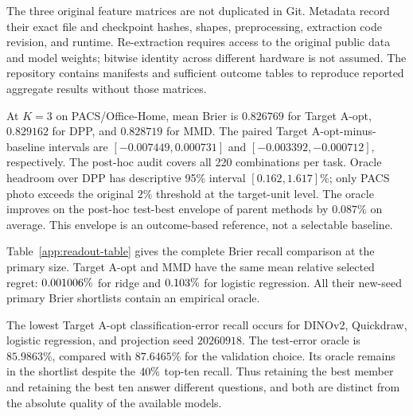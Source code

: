 \documentclass{article}
\begin{document}
The three original feature matrices are not duplicated in Git. Metadata record their exact file and checkpoint hashes, shapes, preprocessing, extraction code revision, and runtime. Re-extraction requires access to the original public data and model weights; bitwise identity across different hardware is not assumed. The repository contains manifests and sufficient outcome tables to reproduce reported aggregate results without those matrices.

At $K=3$ on PACS/Office-Home, mean Brier is $0.826769$ for Target A-opt, $0.829162$ for DPP, and $0.828719$ for MMD. The paired Target A-opt-minus-baseline intervals are $[-0.007449,0.000731]$ and $[-0.003392,-0.000712]$, respectively. The post-hoc audit covers all 220 combinations per task. Oracle headroom over DPP has descriptive 95\% interval $[0.162,1.617]\%$; only PACS photo exceeds the original $2\%$ threshold at the target-unit level. The oracle improves on the post-hoc test-best envelope of parent methods by $0.087\%$ on average. This envelope is an outcome-based reference, not a selectable baseline.

Table~\ref{app:readout-table} gives the complete Brier recall comparison at the primary size. Target A-opt and MMD have the same mean relative selected regret: $0.001006\%$ for ridge and $0.103\%$ for logistic regression. All their new-seed primary Brier shortlists contain an empirical oracle.

\begin{table}[t]
\centering
\caption{The exploratory DomainNet follow-up evaluates shortlists of size $s=227$. Test top-ten recall (\%) is averaged over two encoders and four new projection seeds within each target domain, then over six domains. Ridge denotes ridge-softmax. NLL and error use matching validation losses for final selection.}
\label{tab:readout}

\end{table}

\begin{table}[ht]
\centering
\caption{Brier top-ten recall (\%) is reported for all follow-up scoring rules at $s=227$. Averages use the same domain-level procedure as Table~\ref{tab:readout}; original-seed controls are excluded.}
\label{app:readout-table}

\end{table}

The lowest Target A-opt classification-error recall occurs for DINOv2, Quickdraw, logistic regression, and projection seed $20260918$. The test-error oracle is $85.9863\%$, compared with $87.6465\%$ for the validation choice. Its oracle remains in the shortlist despite the $40\%$ top-ten recall. Thus retaining the best member and retaining the best ten answer different questions, and both are distinct from the absolute quality of the available models.
\end{document}
